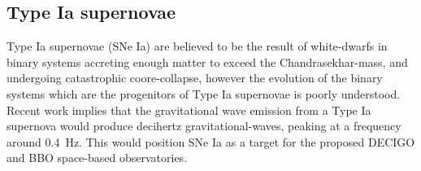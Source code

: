 \subsection{Type Ia supernovae}
\label{sec:type-ia-supernovae}

Type Ia supernovae (SNe Ia) are believed to be the result of
white-dwarfs in binary systems accreting enough matter to exceed the
Chandrasekhar-mass, and undergoing catastrophic
coore-collapse\cite{2013MNRAS.429.1156S}, however the evolution of the
binary systems which are the progenitors of Type Ia supernovae is
poorly understood. Recent work\cite{2015PhRvD..92l4013S} implies that
the gravitational wave emission from a Type Ia supernova would produce
decihertz gravitational-waves, peaking at a frequency around
\SI{0.4}{\hertz}. This would position SNe Ia as a target for the
proposed DECIGO and BBO space-based observatories.

